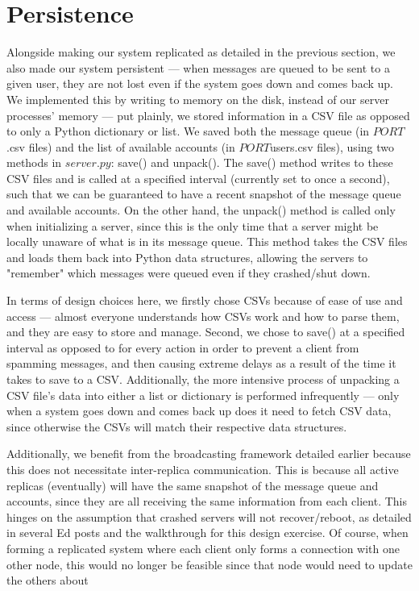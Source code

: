 \documentclass[
	a4paper, %
	10pt, %
	unnumberedsections, %
	twoside, %
]{LTJournalArticle}
\begin{document}
\section{Persistence}

Alongside making our system replicated as detailed in the previous section, we also made our system persistent --- when messages are queued to be sent to a given user, they are not lost even if the system goes down and comes back up. We implemented this by writing to memory on the disk, instead of our server processes' memory --- put plainly, we stored information in a CSV file as opposed to only a Python dictionary or list. We saved both the message queue (in $PORT$.csv files) and the list of available accounts (in $PORT$users.csv files), using two methods in $server.py$: save() and unpack(). The save() method writes to these CSV files and is called at a specified interval (currently set to once a second), such that we can be guaranteed to have a recent snapshot of the message queue and available accounts. On the other hand, the unpack() method is called only when initializing a server, since this is the only time that a server might be locally unaware of what is in its message queue. This method takes the CSV files and loads them back into Python data structures, allowing the servers to "remember" which messages were queued even if they crashed/shut down. 

In terms of design choices here, we firstly chose CSVs because of ease of use and access --- almost everyone understands how CSVs work and how to parse them, and they are easy to store and manage. Second, we chose to save() at a specified interval as opposed to for every action in order to prevent a client from spamming messages, and then causing extreme delays as a result of the time it takes to save to a CSV. Additionally, the more intensive process of unpacking a CSV file's data into either a list or dictionary is performed infrequently --- only when a system goes down and comes back up does it need to fetch CSV data, since otherwise the CSVs will match their respective data structures.

Additionally, we benefit from the broadcasting framework detailed earlier because this does not necessitate inter-replica communication. This is because all active replicas (eventually) will have the same snapshot of the message queue and accounts, since they are all receiving the same information from each client. This hinges on the assumption that crashed servers will not recover/reboot, as detailed in several Ed posts and the walkthrough for this design exercise. Of course, when forming a replicated system where each client only forms a connection with one other node, this would no longer be feasible since that node would need to update the others about
\end{document}
